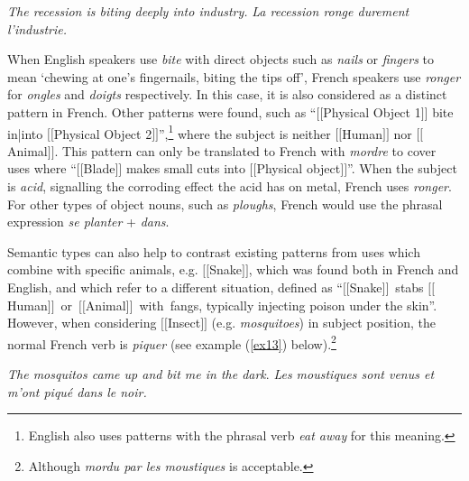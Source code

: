 \documentclass[output=paper]{langsci/langscibook}
\begin{document}
\begin{exe}
\ex \label{ex12}
\begin{xlist}
\ex
\textit{The recession is biting deeply into industry.}
\ex
\textit{La recession ronge durement l'industrie.}
\end{xlist}
\end{exe}








When English speakers use \textit{bite} with direct objects such as \textit{nails} or
\textit{fingers} to mean `chewing at one's fingernails, biting the tips off',
French speakers use \textit{ronger} for \textit{ongles} and \textit{doigts} respectively. In
this case, it is also considered as a distinct pattern in French. Other
patterns were found, such as “$[$$[$Physical Object 1$]$$]$ bite in|into
$[$$[$Physical Object 2$]$$]$”,\footnote{English also uses patterns with the
phrasal verb \textit{eat away} for this meaning.} where the subject is
neither $[$$[$Human$]$$]$ nor $[$$[$Animal$]$$]$. This pattern can only be translated
to French with \textit{mordre} to cover uses where “$[$$[$Blade$]$$]$ makes small cuts
into $[$$[$Physical object$]$$]$”. When the subject is \textit{acid}, signalling the
corroding effect the acid has on metal, French uses \textit{ronger}. For other
types of object nouns, such as \textit{ploughs}, French would use the phrasal
expression \textit{se planter} + \textit{dans}.


\largerpage[2]
Semantic types can also help to contrast existing patterns from uses
which combine with specific animals, e.g. $[$$[$Snake$]$$]$, which was found
both in French and English, and which refer to a different situation,
defined as \mbox{“$[$$[$Snake$]$$]$~stabs} \linebreak \mbox{$[$$[$Human$]$$]$~or~$[$$[$Animal$]$$]$~with fangs},
typically injecting poison under the skin”. However, when considering
$[$$[$Insect$]$$]$ (e.g. \textit{mosquitoes}) in subject position, the normal French
verb is \textit{piquer} (see example (\ref{ex13}) below).\footnote{Although \textit{mordu par
les moustiques} is acceptable.}



\begin{exe}
 \ex \label{ex13}
 \begin{xlist}
 \ex 
 \textit{The mosquitos came up and bit me in the dark}.
 \ex
\textit{Les moustiques sont venus et m'ont piqué dans le noir.}
\end{xlist}
\end{exe}
\end{document}
